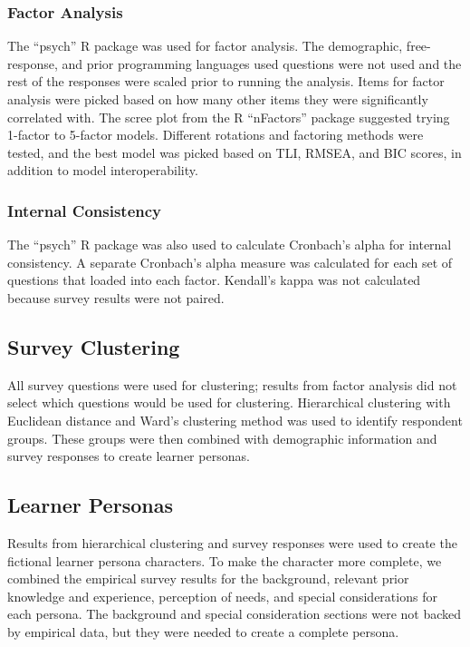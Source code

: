 \documentclass[020-persona\_validation.tex]{subfiles}
\begin{document}
    \subsubsection{Factor Analysis}

        The ``psych'' R package was used for factor analysis.
        The demographic, free-response, and prior programming languages used questions
        were not used and the rest of the responses were scaled prior to running the analysis.
        Items for factor analysis were picked based on how many other items they were significantly correlated with.
        The scree plot from the R ``nFactors'' package suggested trying 1-factor to 5-factor models.
        Different rotations and factoring methods were tested,
        and the best model was picked based on
        TLI, RMSEA, and BIC scores, in addition to model interoperability.


    \subsubsection{Internal Consistency}

        The ``psych'' R package was also used to calculate Cronbach's alpha for internal consistency.
        A separate Cronbach's alpha measure was calculated for each set of questions that loaded into each factor.
        Kendall's kappa was not calculated because survey results were not paired.

    \subsection{Survey Clustering}

        All survey questions were used for clustering;
        results from factor analysis did not select which questions would be used for clustering.
        Hierarchical clustering with Euclidean distance and
        Ward's clustering method was used to identify respondent groups.
        These groups were then combined with demographic information and survey responses to create learner personas.

    \subsection{Learner Personas}

        Results from hierarchical clustering and survey responses were used to create the
        fictional learner persona characters.
        To make the character more complete,
        we combined the empirical survey results for the
        background,
        relevant prior knowledge and experience,
        perception of needs,
        and special considerations
        for each persona.
        The background and special consideration sections were not backed by empirical data,
        but they were needed to create a complete persona.
\end{document}
